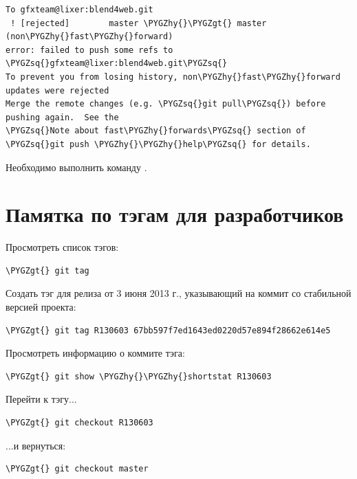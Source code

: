 \documentclass[a4paper,12pt,oneside]{sphinxmanual}
\def\PYGZgt{\char`\>}
\def\PYGZhy{\char`\-}
\def\PYGZsq{\char`\'}
\begin{document}
\begin{Verbatim}[commandchars=\\\{\}]
To gfxteam@lixer:blend4web.git
 ! [rejected]        master \PYGZhy{}\PYGZgt{} master (non\PYGZhy{}fast\PYGZhy{}forward)
error: failed to push some refs to \PYGZsq{}gfxteam@lixer:blend4web.git\PYGZsq{}
To prevent you from losing history, non\PYGZhy{}fast\PYGZhy{}forward updates were rejected
Merge the remote changes (e.g. \PYGZsq{}git pull\PYGZsq{}) before pushing again.  See the
\PYGZsq{}Note about fast\PYGZhy{}forwards\PYGZsq{} section of \PYGZsq{}git push \PYGZhy{}\PYGZhy{}help\PYGZsq{} for details.
\end{Verbatim}

Необходимо выполнить команду .


\section{Памятка по тэгам для разработчиков}
\label{git_short_manual:id19}\label{git_short_manual:index-8}\label{git_short_manual:git-tags}
Просмотреть список тэгов:

\begin{Verbatim}[commandchars=\\\{\}]
\PYGZgt{} git tag
\end{Verbatim}

Создать тэг для релиза от 3 июня 2013 г., указывающий на коммит со стабильной версией проекта:

\begin{Verbatim}[commandchars=\\\{\}]
\PYGZgt{} git tag R130603 67bb597f7ed1643ed0220d57e894f28662e614e5
\end{Verbatim}

Просмотреть информацию о коммите тэга:

\begin{Verbatim}[commandchars=\\\{\}]
\PYGZgt{} git show \PYGZhy{}\PYGZhy{}shortstat R130603
\end{Verbatim}

Перейти к тэгу...

\begin{Verbatim}[commandchars=\\\{\}]
\PYGZgt{} git checkout R130603
\end{Verbatim}

...и вернуться:

\begin{Verbatim}[commandchars=\\\{\}]
\PYGZgt{} git checkout master
\end{Verbatim}
\end{document}
